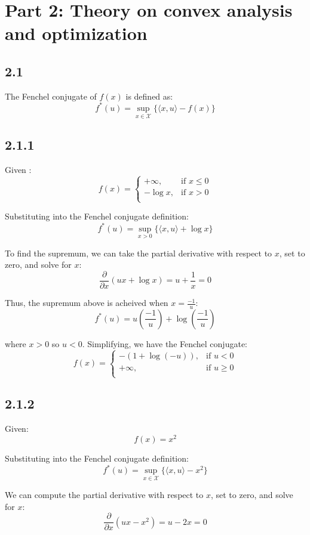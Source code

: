 \documentclass[12pt]{article}
\begin{document}
\newpage
\section*{Part 2: Theory on convex analysis and optimization}
\subsection*{2.1}

The Fenchel conjugate of $f(x)$ is defined as:
\[f^*(u) = \sup_{x\in \mathcal{X}} \{ \langle x, u\rangle - f(x) \}\]

\subsection*{2.1.1}

Given :
\[ f(x) = \begin{cases}
      +\infty, & \text{if } x \leq 0 \\
      -\log x, & \text{if } x > 0 \\
   \end{cases}\]

Substituting into the Fenchel conjugate definition:
\[f^*(u) = \sup_{x > 0} \{ \langle x, u\rangle +  \log x \}\]

To find the supremum, we can take the partial derivative with respect to $x$, set to zero, and solve for $x$:
\[\frac{\partial}{\partial x}(ux + \log x) = u + \frac{1}{x} = 0\]

Thus, the supremum above is acheived when $x=\frac{-1}{u}$:
\[f^*(u) = u \left(\frac{-1}{u} \right) +  \log\left(\frac{-1}{u} \right) \]

where $x>0$ so $u < 0$.
Simplifying, we have the Fenchel conjugate:
\[ f(x) = \begin{cases}
      - (1 + \log (-u)), & \text{if } u < 0 \\
      +\infty, & \text{if } u \geq 0 \\
   \end{cases}\]


\subsection*{2.1.2} Given:
\[f(x) = x^2\]

Substituting into the Fenchel conjugate definition:
\[f^*(u) = \sup_{x\in \mathcal{X}} \{ \langle x, u\rangle - x^2 \}\]

We can compute the partial derivative with respect to $x$, set to zero, and solve for $x$:
\[\frac{\partial}{\partial x}(ux - x^2) = u - 2x = 0\]
\end{document}
